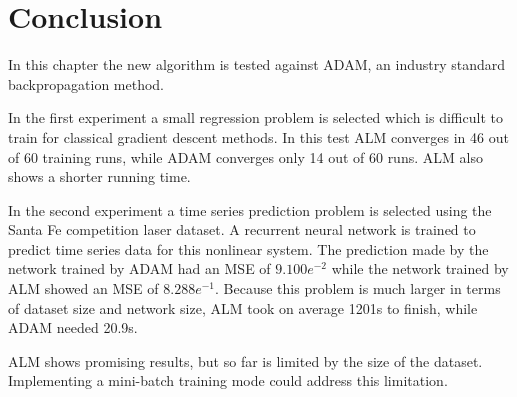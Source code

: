 \section{Conclusion}
In this chapter the new algorithm is tested against ADAM, an industry standard backpropagation method.

In the first experiment a small regression problem is selected which is difficult to train for classical gradient descent methods.  In this test ALM converges in 46 out of 60 training runs, while ADAM converges only 14 out of 60 runs. ALM also shows a shorter running time.

In the second experiment a time series prediction problem is selected using the Santa Fe competition laser dataset. A recurrent neural network is trained to predict time series data for this nonlinear system. The prediction made by the network trained by ADAM had an MSE of $9.100e^{-2}$ while the network trained by ALM showed an MSE of $8.288e^{-1}$. Because this problem is much larger in terms of dataset size and network size, ALM took on average 1201s to finish, while ADAM needed 20.9s.

ALM shows promising results, but so far is limited by the size of the dataset. Implementing a mini-batch training mode could address this limitation.





